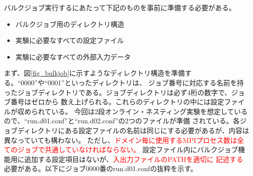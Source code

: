 

バルクジョブ実行するにあたって下記のものを事前に準備する必要がある。
\begin{itemize}
\item バルクジョブ用のディレクトリ構造
\item 実験に必要なすべての設定ファイル
\item 実験に必要なすべての外部入力データ
\end{itemize}

まず、図\ref{fig_bulkjob}に示すようなディレクトリ構造を準備する。``0000''や``0001''といったディレクトリは、
ジョブ番号に対応する名前を持ったジョブディレクトリである。ジョブディレクトリは必ず4桁の数字で、ジョブ番号はゼロから
数え上げられる。これらのディレクトリの中には設定ファイルが収められている。
今回は2段オンライン・ネスティング実験を想定しているので、``run.d01.conf''と``run.d02.conf''の2つのファイルが準備
されている。各ジョブディレクトリにある設定ファイルの名前は同じにする必要があるが、内容は異なっていても構わない。
ただし、\textcolor{red}{ドメイン毎に使用するMPIプロセス数は全てのジョブで共通していなければならない。}
設定ファイル内にバルクジョブ機能用に追加する設定項目はないが、\textcolor{red}{入出力ファイルのPATHを適切に
記述する}必要がある。以下にジョブ0000番のrun.d01.confの抜粋を示す。\\

